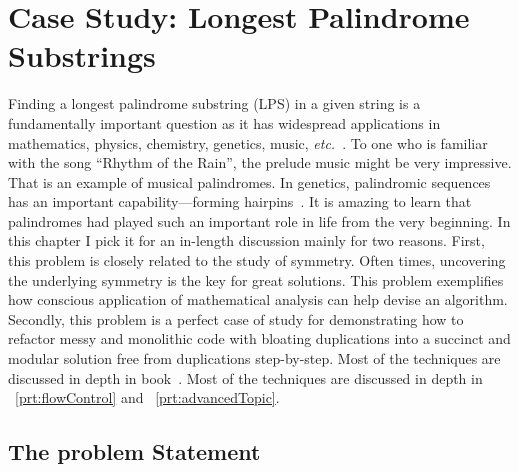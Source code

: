 
\chapter{Case Study: Longest Palindrome Substrings}\label{ch:longestPalindromeSubstrings}

Finding a longest palindrome substring (LPS) in a given string is a fundamentally important
question as it has widespread applications in mathematics, physics, chemistry, genetics, music,
\textit{etc.}~\cite{Manacher:1975, shiu2010data, jeuring1993theories, galil1981string,
crochemore1994text}.
To one who is familiar with the song ``Rhythm of the Rain'', the prelude music might be
very impressive.
That is an example of musical palindromes.
In genetics, palindromic sequences has an important capability---forming
hairpins~\cite{chaos2008palindromelifeorigin}.
It is amazing to learn that palindromes had played such an important role in life from the
very beginning.
In this chapter I pick it for an in-length discussion mainly for two reasons.
First, this problem is closely related to the study of symmetry.
Often times, uncovering the underlying symmetry is the key for great solutions.
This problem exemplifies how conscious application of
mathematical analysis can help devise an algorithm.
Secondly, this problem is a perfect case of study for demonstrating how to refactor messy and
monolithic code with bloating duplications into a succinct and modular solution free
from duplications step-by-step.
Most of the techniques are discussed in depth in book~\cite{Wan:book}.
Most of the techniques are discussed in depth in
~\autoref{prt:flowControl} and ~\autoref{prt:advancedTopic}.


\section{The problem Statement}\label{sec:lps-statement}

